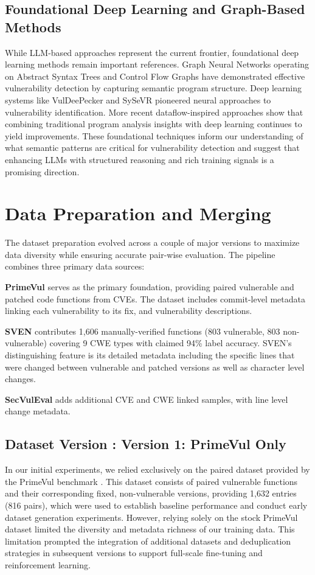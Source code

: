\documentclass[12pt,a4paper]{article}
\makeatletter
\newcounter{DataVer}
\newcommand{\dataversion}[2]{%
  \stepcounter{DataVer}%
  \subsection{Dataset Version \theDataVer: #1}%
  \protected@edef\@currentlabel{\theDataVer}\label{#2}%
}
\makeatother
\begin{document}
\subsection{Foundational Deep Learning and Graph-Based Methods}

While LLM-based approaches represent the current frontier, foundational deep learning methods remain important references. Graph Neural Networks operating on Abstract Syntax Trees and Control Flow Graphs \cite{devign} have demonstrated effective vulnerability detection by capturing semantic program structure. Deep learning systems like VulDeePecker \cite{VulDeePecker_paper} and SySeVR \cite{SySeVR_paper} pioneered neural approaches to vulnerability identification. More recent dataflow-inspired approaches \cite{deepdfa} show that combining traditional program analysis insights with deep learning continues to yield improvements. These foundational techniques inform our understanding of what semantic patterns are critical for vulnerability detection and suggest that enhancing LLMs with structured reasoning and rich training signals is a promising direction.

\section{Data Preparation and Merging}

The dataset preparation evolved across a couple of major versions to maximize data diversity while ensuring accurate pair-wise evaluation. The pipeline combines three primary data sources:

\textbf{PrimeVul} serves as the primary foundation, providing paired vulnerable and patched code functions from CVEs. The dataset includes commit-level metadata linking each vulnerability to its fix, and vulnerability descriptions.

\textbf{SVEN} contributes 1,606 manually-verified functions (803 vulnerable, 803 non-vulnerable) covering 9 CWE types with claimed 94\% label accuracy. SVEN's distinguishing feature is its detailed metadata including the specific lines that were changed between vulnerable and patched versions as well as character level changes.

\textbf{SecVulEval} adds additional CVE and CWE linked samples, with line level change metadata.

\dataversion{Version 1: PrimeVul Only}{ver:data_sem2_primevulonly}
In our initial experiments, we relied exclusively on the paired dataset provided by the PrimeVul benchmark \cite{primevul}. This dataset consists of paired vulnerable functions and their corresponding fixed, non-vulnerable versions, providing 1,632 entries (816 pairs), which were used to establish baseline performance and conduct early dataset generation experiments. However, relying solely on the stock PrimeVul dataset limited the diversity and metadata richness of our training data. This limitation prompted the integration of additional datasets and deduplication strategies in subsequent versions to support full-scale fine-tuning and reinforcement learning.
\end{document}
